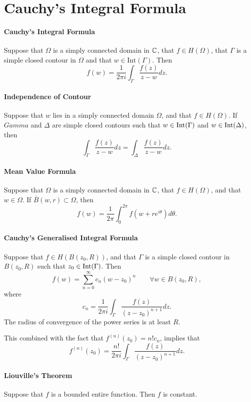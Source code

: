 \section{Cauchy's Integral Formula}

\paragraph{Cauchy's Integral Formula}
Suppose that \(\Omega\) is a simply connected domain in \(\mathbb{C}\), that \(f \in H(\Omega)\), that \(\Gamma\) is a simple closed contour in \(\Omega\) and that \(w \in \mathrm{Int}(\Gamma)\). Then
\[f(w) = \frac{1}{2\pi i} \int_\Gamma \frac{f(z)}{z - w} dz.\]

\paragraph{Independence of Contour}
Suppose that \(w\) lies in a simply connected domain \(\Omega\), and that \(f \in H(\Omega)\). If \(Gamma\) and \(\Delta\) are simple closed contours such that \(w \in \mathrm{Int}(\Gamma)\) and \(w \in \mathrm{Int}(\Delta)\), then
\[\int_\Gamma \frac{f(z)}{z - w} dz = \int_\Delta \frac{f(z)}{z - w} dz.\]

\paragraph{Mean Value Formula}
Suppose that \(\Omega\) is a simply connected domain in \(\mathbb{C}\), that \(f \in H(\Omega)\), and that \(w \in \Omega\). If \(\bar{B}(w, r) \subset \Omega\), then
\[f(w) = \frac{1}{2\pi} \int_0^{2\pi} f(w + re^{i\theta}) d\theta.\]

\paragraph{Cauchy's Generalised Integral Formula}
Suppose that \(f \in H(B(z_0, R))\), and that \(\Gamma\) is a simple closed contour in \(B(z_0, R)\) such that \(z_0 \in \mathrm{Int}(\Gamma)\). Then
\[f(w) = \sum_{n=0}^\infty c_n(w - z_0)^n \qquad \forall w \in B(z_0, R),\]
where
\[c_n = \frac{1}{2\pi i} \int_\Gamma \frac{f(z)}{(z - z_0)^{n + 1}} dz.\]
The radius of convergence of the power series is at least \(R\).

This combined with the fact that \(f^{(n)}(z_0) = n!c_n\), implies that
\[f^{(n)}(z_0) = \frac{n!}{2\pi i}\int_\Gamma \frac{f(z)}{(z - z_0)^{n+1}} dz.\]

\paragraph{Liouville's Theorem}
Suppose that \(f\) is a bounded entire function. Then \(f\) is constant.


